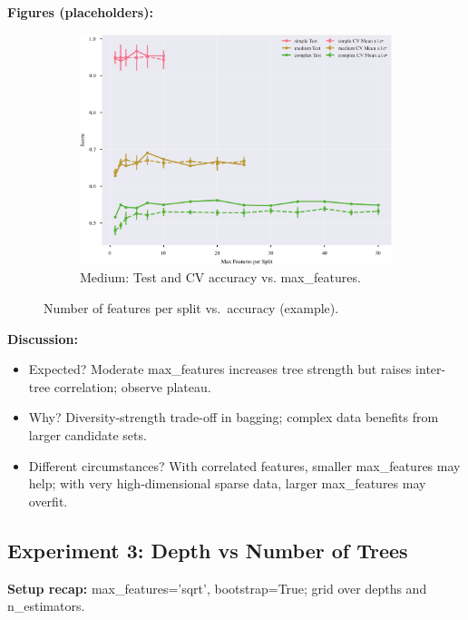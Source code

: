 \documentclass[conference]{IEEEtran}
\begin{document}
\textbf{Figures (placeholders):}
\begin{figure}[H]
  \centering
  \begin{subfigure}[b]{\columnwidth}
    \centering
    \includegraphics[width=\linewidth]{images/all_datasets_accuracy_vs_features.png}
    \caption{Medium: Test and CV accuracy vs. max\_features.}
    \label{fig:exp2-medium-acc}
  \end{subfigure}
  \caption{Number of features per split vs.\ accuracy (example).}
  \label{fig:exp2-accuracy-features}
\end{figure}


\textbf{Discussion:}
\begin{itemize}
  \item Expected? Moderate max\_features increases tree strength but raises inter-tree correlation; observe plateau.
  \item Why? Diversity-strength trade-off in bagging; complex data benefits from larger candidate sets.
  \item Different circumstances? With correlated features, smaller max\_features may help; with very high-dimensional sparse data, larger max\_features may overfit.
\end{itemize}

\subsection{Experiment 3: Depth vs Number of Trees}
\label{sec:results-exp3}
\textbf{Setup recap:} max\_features='sqrt', bootstrap=True; grid over depths and n\_estimators.
\end{document}
